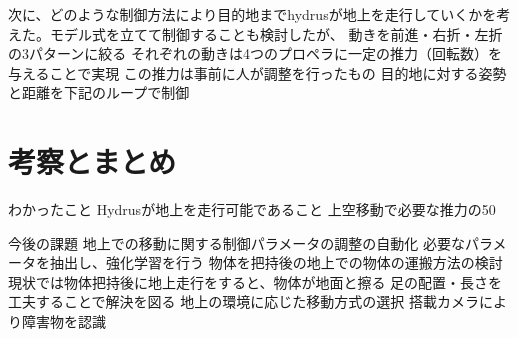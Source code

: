 \documentclass[twocolumn]{preport}
\begin{document}
次に、どのような制御方法により目的地までhydrusが地上を走行していくかを考えた。モデル式を立てて制御することも検討したが、
動きを前進・右折・左折の3パターンに絞る
それぞれの動きは4つのプロペラに一定の推力（回転数）を与えることで実現
この推力は事前に人が調整を行ったもの
目的地に対する姿勢と距離を下記のループで制御


\section{考察とまとめ}
わかったこと
Hydrusが地上を走行可能であること
上空移動で必要な推力の50%

今後の課題
地上での移動に関する制御パラメータの調整の自動化
必要なパラメータを抽出し、強化学習を行う
物体を把持後の地上での物体の運搬方法の検討
現状では物体把持後に地上走行をすると、物体が地面と擦る
足の配置・長さを工夫することで解決を図る
地上の環境に応じた移動方式の選択
搭載カメラにより障害物を認識





\end{document}
